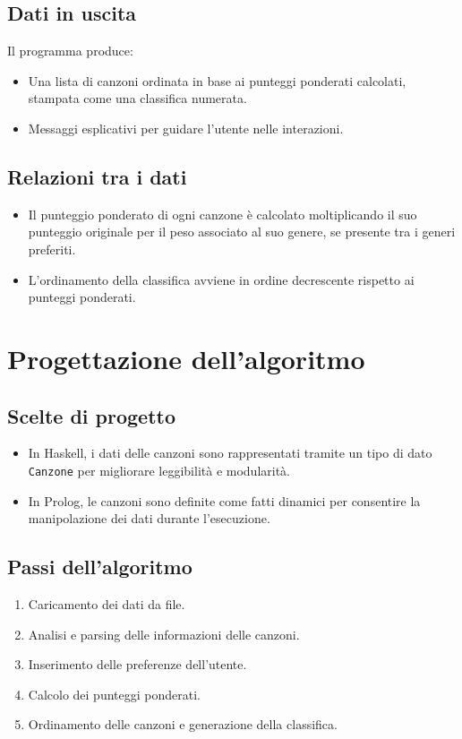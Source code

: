 \documentclass[a4paper,11pt]{article}
\begin{document}
\subsection{Dati in uscita}
Il programma produce:
\begin{itemize}
    \item Una lista di canzoni ordinata in base ai punteggi ponderati calcolati, stampata come una classifica numerata.
    \item Messaggi esplicativi per guidare l'utente nelle interazioni.
\end{itemize}

\subsection{Relazioni tra i dati}
\begin{itemize}
    \item Il punteggio ponderato di ogni canzone è calcolato moltiplicando il suo punteggio originale per il peso associato al suo genere, se presente tra i generi preferiti.
    \item L'ordinamento della classifica avviene in ordine decrescente rispetto ai punteggi ponderati.
\end{itemize}

\section{Progettazione dell'algoritmo}

\subsection{Scelte di progetto}
\begin{itemize}
    \item In Haskell, i dati delle canzoni sono rappresentati tramite un tipo di dato \texttt{Canzone} per migliorare leggibilità e modularità.
    \item In Prolog, le canzoni sono definite come fatti dinamici per consentire la manipolazione dei dati durante l'esecuzione.
\end{itemize}

\subsection{Passi dell'algoritmo}
\begin{enumerate}
    \item Caricamento dei dati da file.
    \item Analisi e parsing delle informazioni delle canzoni.
    \item Inserimento delle preferenze dell'utente.
    \item Calcolo dei punteggi ponderati.
    \item Ordinamento delle canzoni e generazione della classifica.
\end{enumerate}
\end{document}
